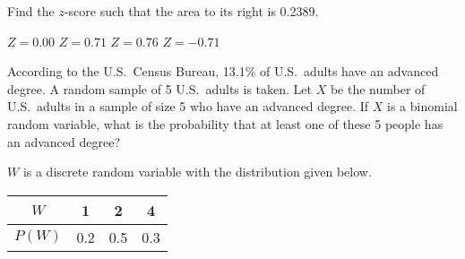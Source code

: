 \documentclass[noanswers]{exam}
\begin{document}
\begin{questions}
\question Find the $z$-score such that the area to its right is 0.2389.

\vspace{3mm}

\begin{choices}
	\choice $Z=0.00$
	\CorrectChoice $Z=0.71$
	\choice $Z=0.76$
	\choice $Z=-0.71$
\end{choices}

\vspace{3mm}

\question According to the U.S.\ Census Bureau, 13.1\% of U.S.\ adults have an advanced degree. A random sample of 5 U.S.\ adults is taken. Let $X$ be the number of U.S.\ adults in a sample of size 5 who have an advanced degree. If $X$ is a binomial random variable, what is the probability that at least one of these 5 people has an advanced degree?

\vspace{3mm}

\begin{choices}
\end{choices}

\vspace{3mm}

\question $W$ is a discrete random variable with the distribution given below.

\begin{center}
\begin{tabular}{c|ccc}
$W$ & 1 & 2 & 4 \\
\hline
$P(W)$ & 0.2 & 0.5 & 0.3\\
\end{tabular}
\end{center}
\end{questions}
\end{document}
